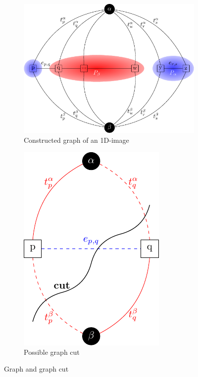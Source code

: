 \documentclass[runningheads,a4paper]{llncs}
\begin{document}
        \begin{figure}[h]
            \begin{subfigure}[t]{0.5\textwidth}
                \centering
                \includegraphics[width=1\textwidth]{../figures/pixel/pixel_skizze.pdf}
                \caption{Constructed graph of an 1D-image}
                \label{fig:graph}
            \end{subfigure}
            \begin{subfigure}[t]{0.5\textwidth}
                \centering
                \includegraphics[width=.6\textwidth]{../figures/graph_cut/graph_1.pdf}
                \caption{Possible graph cut}
                \label{fig:cut}
            \end{subfigure}
            \caption{Graph and graph cut}
        \end{figure}
\end{document}
